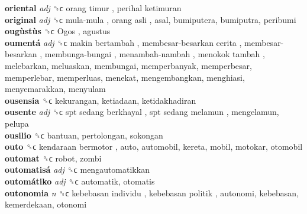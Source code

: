 \textbf{oriental} \emph{adj}  ␝ϲ   orang timur ,  perihal ketimuran   \\
\textbf{original} \emph{adj}  ␝ϲ   mula-mula ,  orang asli , asal, bumiputera, bumiputra, peribumi  \\
\textbf{ougùstùs} ␝ϲ   Ogos , agustus  \\
\textbf{oumentá} \emph{adj}  ␝ϲ   makin bertambah ,  membesar-besarkan cerita ,  membesar-besarkan ,  membunga-bungai ,  menambah-nambah ,  menokok tambah , melebarkan, meluaskan, membungai, memperbanyak, memperbesar, memperlebar, memperluas, menekat, mengembangkan, menghiasi, menyemarakkan, menyulam  \\
\textbf{ousensia} ␝ϲ  kekurangan, ketiadaan, ketidakhadiran  \\
\textbf{ousente} \emph{adj}  ␝ϲ   spt sedang berkhayal ,  spt sedang melamun , mengelamun, pelupa  \\
\textbf{ousilio} ␝ϲ  bantuan, pertolongan, sokongan  \\
\textbf{outo} ␝ϲ   kendaraan bermotor , auto, automobil, kereta, mobil, motokar, otomobil  \\
\textbf{outomat} ␝ϲ  robot, zombi  \\
\textbf{outomatisá} \emph{adj}  ␝ϲ  mengautomatikkan  \\
\textbf{outomátiko} \emph{adj}  ␝ϲ  automatik, otomatis  \\
\textbf{outonomia} \emph{n}  ␝ϲ   kebebasan individu ,  kebebasan politik , autonomi, kebebasan, kemerdekaan, otonomi  \\

